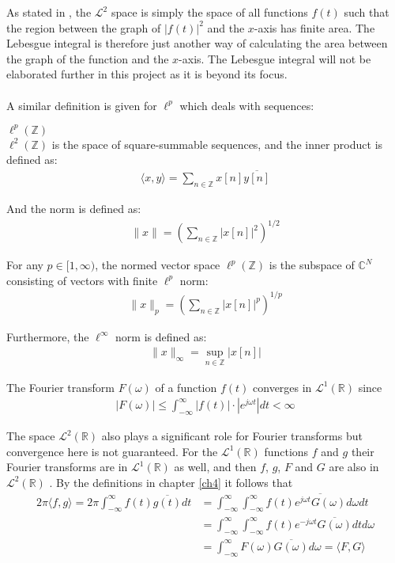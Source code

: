 As stated in \cite{page 74, FAA}, the $\mathcal{L}^2$ space is simply the space of all functions $f(t)$ such that the region between the graph of $|f(t)|^2$ and the $x$-axis  has finite area. The Lebesgue integral is therefore just another way of calculating the area between the graph of the function and the $x$-axis. The Lebesgue integral will not be elaborated further in this project as it is beyond its focus.
\\ \\
A similar definition is given for $\ell^p$ which deals with sequences:
\begin{definition}{$\ell^p(\mathbb{Z})$}
\\
$\ell^2(\mathbb{Z})$ is the space of square-summable sequences, and the inner product is defined as:
\begin{align*}
\langle x,y \rangle = \sum_{n\in\mathbb{Z}} x[n] \overline{y[n]}
\end{align*}

And the norm is defined as:
\begin{align*}
\|x\| = \left( \sum_{n\in\mathbb{Z}} |x[n]|^2 \right)^{1/2}
\end{align*}

For any $p \in [1,\infty)$, the normed vector space $\ell^p(\mathbb{Z})$ is the subspace of $\mathbb{C}^N$ consisting of vectors with finite $\ell^p$ norm:
\begin{align*}
\|x\|_p = \left( \sum_{n\in\mathbb{Z}} |x[n]|^p \right)^{1/p}
\end{align*}

Furthermore, the $\ell^\infty$ norm is defined as:
\begin{align*}
\|x\|_\infty = \sup_{n\in\mathbb{Z}}|x[n]|
\end{align*}
\end{definition}

The Fourier transform $F(\omega)$ of a function $f(t)$ converges in $\mathcal{L}^1(\mathbb{R})$ since
\begin{align*}
|F(\omega)| \leq \int_{-\infty}^\infty |f(t)| \cdot |e^{j \omega t}| dt < \infty
\end{align*}

\noindent
The space $\mathcal{L}^2(\mathbb{R})$ also plays a significant role for Fourier transforms but convergence here is not guaranteed. For the $\mathcal{L}^1(\mathbb{R})$ functions $f$ and $g$ their Fourier transforms are in $\mathcal{L}^1(\mathbb{R})$ as well, and then $f$, $g$, $F$ and $G$ are also in $\mathcal{L}^2(\mathbb{R})$ \cite{page 219, FAA}. By the definitions in chapter \ref{ch4} it follows that
\begin{align*}
2\pi \langle f,g \rangle = 2\pi \int_{-\infty}^\infty f(t) \overline{g(t)} dt &= \int_{-\infty}^\infty \int_{-\infty}^\infty f(t) \overline{e^{j\omega t} G(\omega)} d\omega dt \\
&= \int_{-\infty}^\infty \int_{-\infty}^\infty f(t) e^{-j\omega t} \overline{G(\omega)} dt d\omega \\
&= \int_{-\infty}^\infty F(\omega) \overline{G(\omega)} d\omega = \langle F,G \rangle
\end{align*}

